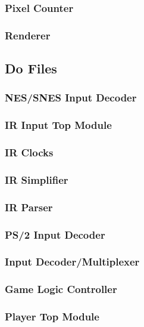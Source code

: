 \documentclass[]{article}
\begin{document}
\subsubsection{Pixel Counter}

\subsubsection{Renderer}

\subsection{Do Files}
\subsubsection{NES/SNES Input Decoder}

\subsubsection{IR Input Top Module}

\subsubsection{IR Clocks}

\subsubsection{IR Simplifier}

\subsubsection{IR Parser}

\subsubsection{PS/2 Input Decoder}

\subsubsection{Input Decoder/Multiplexer}

\subsubsection{Game Logic Controller}

\subsubsection{Player Top Module}

\end{document}
